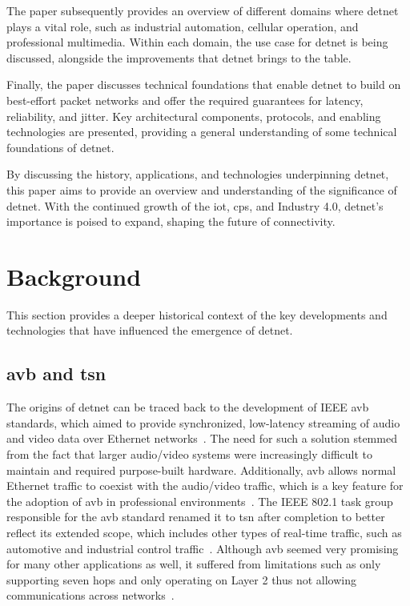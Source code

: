 \documentclass[runningheads]{llncs}
\begin{document}
The paper subsequently provides an overview of different domains where \gls{detnet} plays a vital role, such as industrial automation, cellular operation, and professional multimedia. Within each domain, the use case for \gls{detnet} is being discussed, alongside the improvements that \gls{detnet} brings to the table.

Finally, the paper discusses technical foundations that enable \gls{detnet} to build on best-effort packet networks and offer the required guarantees for latency, reliability, and jitter. Key architectural components, protocols, and enabling technologies are presented, providing a general understanding of some technical foundations of \gls{detnet}.

By discussing the history, applications, and technologies underpinning \gls{detnet}, this paper aims to provide an overview and understanding of the significance of \gls{detnet}. With the continued growth of the \gls{iot}, \gls{cps}, and Industry 4.0, \gls{detnet}'s importance is poised to expand, shaping the future of connectivity.

\section{Background}

This section provides a deeper historical context of the key developments and technologies that have influenced the emergence of \gls{detnet}.

\subsection*{\gls{avb} and \gls{tsn}}
The origins of \gls{detnet} can be traced back to the development of IEEE \gls{avb} standards, which aimed to provide synchronized, low-latency streaming of audio and video data over Ethernet networks~\cite{Yang2019}. The need for such a solution stemmed from the fact that larger audio/video systems were increasingly difficult to maintain and required purpose-built hardware. Additionally, \gls{avb} allows normal Ethernet traffic to coexist with the audio/video traffic, which is a key feature for the adoption of \gls{avb} in professional environments~\cite{Lim2012}. The IEEE 802.1 task group responsible for the \gls{avb} standard renamed it to \gls{tsn} after completion to better reflect its extended scope, which includes other types of real-time traffic, such as automotive and industrial control traffic~\cite{Wollschlaeger2017}. Although \gls{avb} seemed very promising for many other applications as well, it suffered from limitations such as only supporting seven hops and only operating on Layer 2 thus not allowing communications across networks~\cite{Imtiaz2009}.
\end{document}
